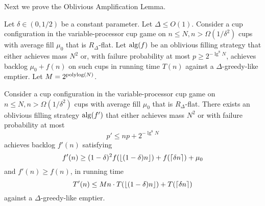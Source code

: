 Next we prove the Oblivious Amplification Lemma.
\begin{lemma}
  \label{lem:TO_obliviousAmplification} 
  Let $\delta \in (0, 1/2)$ be a constant parameter. Let $\Delta
  \le O(1)$. Consider a cup configuration
  in the variable-processor cup game on $n \le N, n >
  \Omega(1/\delta^2)$ cups with average fill $\mu_0$ that is
  $R_\Delta$-flat. Let $\operatorname{\text{\textup{alg}}}(f)$ be an oblivious filling strategy
  that either achieves mass $N^2$ or, with failure probability at
  most $p\ge 2^{-\lg^8 N}$, achieves backlog $\mu_0 + f(n)$ on such cups
  in running time $T(n)$ against a $\Delta$-greedy-like emptier.
  Let $M = 2^{\operatorname{\text{polylog}}(N)}$.

  Consider a cup configuration in the variable-processor cup game
  on $n \le N, n > \Omega(1/\delta^2)$ cups with average fill
  $\mu_0$ that is $R_\Delta$-flat. There exists an oblivious
  filling strategy $\operatorname{\text{\textup{alg}}}(f')$ that either achieves mass $N^2$ or
  with failure probability at most 
  $$p' \le np + 2^{-\lg^8 N}$$
  achieves backlog $f'(n)$ satisfying 
  $$f'(n) \ge (1-\delta)^2 f(\left\lfloor (1-\delta)n \right\rfloor) + f(\left\lceil \delta n \right\rceil) + \mu_0$$ 
  and $f'(n) \ge f(n)$, in running time 
  $$T'(n) \le Mn\cdot T(\left\lfloor (1-\delta)n \right\rfloor) + T(\left\lceil \delta n \right\rceil)$$
  against a $\Delta$-greedy-like emptier.
\end{lemma}

